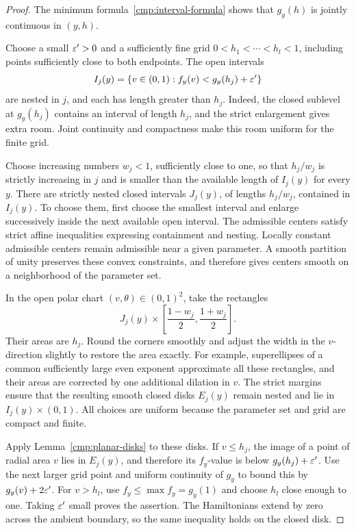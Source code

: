 \begin{proof}
The minimum formula~\eqref{cmp:interval-formula} shows that
\(g_y(h)\) is jointly continuous in \((y,h)\).

Choose a small \(\varepsilon'>0\) and a sufficiently fine grid
\(0<h_1<\cdots<h_l<1\), including points sufficiently close to both
endpoints. The open intervals
\[
 I_j(y)=
 \{v\in(0,1):f_y(v)<g_y(h_j)+\varepsilon'\}
\]
are nested in \(j\), and each has length greater than \(h_j\).
Indeed, the closed sublevel at \(g_y(h_j)\) contains an interval
of length \(h_j\), and the strict enlargement gives extra room.
Joint continuity and compactness make this room uniform for the
finite grid.

Choose increasing numbers \(w_j<1\), sufficiently close to one, so
that \(h_j/w_j\) is strictly increasing in \(j\) and is smaller than
the available length of \(I_j(y)\) for every \(y\).
There are strictly nested closed intervals \(J_j(y)\), of lengths
\(h_j/w_j\), contained in \(I_j(y)\). To choose them, first choose
the smallest interval and enlarge successively inside the next
available open interval. The admissible centers satisfy strict
affine inequalities expressing containment and nesting. Locally
constant admissible centers remain admissible near a given
parameter. A smooth partition of unity preserves these convex
constraints, and therefore gives centers smooth on a neighborhood
of the parameter set.

In the open polar chart \((v,\theta)\in(0,1)^2\), take the rectangles
\[
 J_j(y)\times
 \left[\frac{1-w_j}{2},\frac{1+w_j}{2}\right].
\]
Their areas are \(h_j\). Round the corners smoothly and adjust the
width in the \(v\)-direction slightly to restore the area exactly.
For example, superellipses of a common sufficiently large even
exponent approximate all these rectangles, and their areas are
corrected by one additional dilation in \(v\).
The strict margins ensure that the resulting smooth closed disks
\(E_j(y)\) remain nested and lie in \(I_j(y)\times(0,1)\).
All choices are uniform because the parameter set and grid are
compact and finite.

Apply Lemma~\ref{cmp:planar-disks} to these disks. If \(v\le h_j\),
the image of a point of radial area \(v\) lies in \(E_j(y)\), and
therefore its \(f_y\)-value is below \(g_y(h_j)+\varepsilon'\).
Use the next larger grid point and uniform continuity of \(g_y\)
to bound this by \(g_y(v)+2\varepsilon'\).
For \(v>h_l\), use
\(f_y\le\max f_y=g_y(1)\) and choose \(h_l\) close enough to one.
Taking \(\varepsilon'\) small proves the assertion. The Hamiltonians
extend by zero across the ambient boundary, so the same inequality
holds on the closed disk.
\end{proof}

